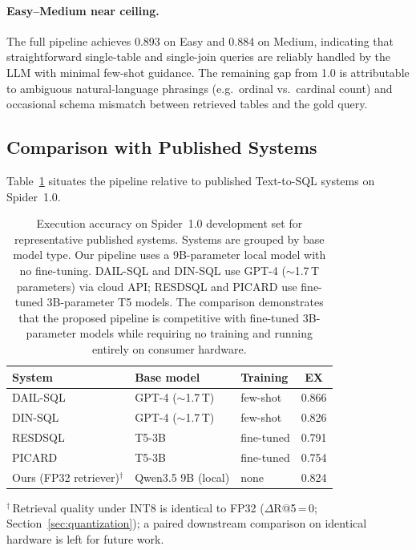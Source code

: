 \paragraph{Easy--Medium near ceiling.}
The full pipeline achieves 0.893 on Easy and 0.884 on Medium, indicating
that straightforward single-table and single-join queries are reliably
handled by the LLM with minimal few-shot guidance.
The remaining gap from 1.0 is attributable to ambiguous natural-language
phrasings (e.g.\ ordinal vs.\ cardinal count) and occasional schema
mismatch between retrieved tables and the gold query.

\subsection{Comparison with Published Systems}

Table~\ref{tab:sota} situates the pipeline relative to published
Text-to-SQL systems on Spider~1.0.

\begin{table}[!tbp]
  \centering
  \caption[Comparison with published Text-to-SQL systems]{Execution
    accuracy on Spider~1.0 development set for representative published
    systems.
    Systems are grouped by base model type.
    Our pipeline uses a 9B-parameter local model with no fine-tuning.
    DAIL-SQL and DIN-SQL use GPT-4 ($\sim$1.7\,T parameters) via
    cloud API; RESDSQL and PICARD use fine-tuned 3B-parameter T5 models.
    The comparison demonstrates that the proposed pipeline is competitive
    with fine-tuned 3B-parameter models while requiring no training and
    running entirely on consumer hardware.}
  \label{tab:sota}
  \begin{tabular}{lllc}
    \toprule
    System & Base model & Training & EX \\
    \midrule
    DAIL-SQL~\citep{gao2023dailsql}     & GPT-4 ($\sim$1.7\,T) & few-shot & 0.866 \\
    DIN-SQL~\citep{pourreza2023dinsql}  & GPT-4 ($\sim$1.7\,T) & few-shot & 0.826 \\
    \midrule
    RESDSQL~\citep{li2023resdsql}       & T5-3B               & fine-tuned & 0.791 \\
    PICARD~\citep{scholak2021picard}    & T5-3B               & fine-tuned & 0.754 \\
    \midrule
    Ours (FP32 retriever)$^\dagger$    & Qwen3.5 9B (local)  & none       & 0.824 \\
    \bottomrule
  \end{tabular}
  \smallskip
  {\footnotesize $^\dagger$\,Retrieval quality under INT8 is identical to
  FP32 ($\Delta$R@5\,=\,0; Section~\ref{sec:quantization}); a paired
  downstream comparison on identical hardware is left for future work.}
\end{table}

